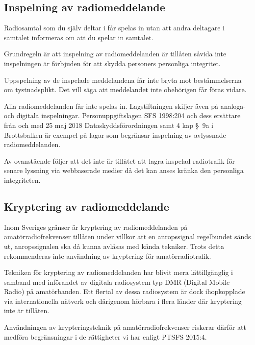 \subsection{Inspelning av radiomeddelande}

Radiosamtal som du själv deltar i får spelas in utan att andra deltagare i
samtalet informeras om att du spelar in samtalet.

Grundregeln är att inspelning av radiomeddelanden är tillåten såvida inte
inspelningen är förbjuden för att skydda personers personliga integritet.

Uppspelning av de inspelade meddelandena får inte bryta mot bestämmelserna om
tystnadsplikt.
Det vill säga att meddelandet inte obehörigen får föras vidare.

Alla radiomeddelanden får inte spelas in.
Lagstiftningen skiljer även på analoga- och digitala inspelningar.
Personuppgiftslagen SFS 1998:204 \cite{SFS1998:204} och dess ersättare från och
med 25 maj 2018 Dataskyddsförordningen \cite{GDPR} samt 4 kap \S~9a i
Brottsbalken \cite{SFS1962:700} är exempel på lagar som begränsar inspelning av
avlyssnade radiomeddelanden.

Av ovanstående följer att det inte är tillåtet att lagra inspelad radiotrafik
för senare lyssning via webbaserade medier då det kan anses kränka den
personliga integriteten.

\subsection{Kryptering av radiomeddelande}

Inom Sveriges gränser är kryptering av radiomeddelanden på amatörradiofrekvenser
tillåten under villkor att en anropssignal regelbundet sänds ut, anropssignalen
ska då kunna avläsas med kända tekniker.
Trots detta rekommenderas inte användning av kryptering för amatörradiotrafik.

Tekniken för kryptering av radiomeddelanden har blivit mera lättillgänglig i
samband med införandet av digitala radiosystem typ DMR (Digital Mobile Radio) på
amatörbanden.
Ett flertal av dessa radiosystem är dock ihopkopplade via internationella
nätverk och därigenom hörbara i flera länder där kryptering inte är tillåten.

Användningen av krypteringsteknik på amatörradiofrekvenser riskerar därför att
medföra begränsningar i de rättigheter vi har enligt PTSFS 2015:4.

